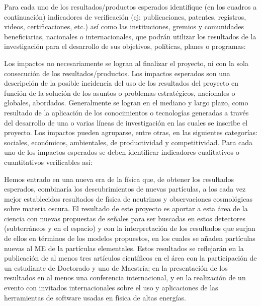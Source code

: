 \begin{instrucciones}
  Para cada uno de los resultados/productos esperados identifique (en
  los cuadros a continuación) indicadores de verificación (ej:
  publicaciones, patentes, registros, videos, certificaciones, etc.)
  así como las instituciones, gremios y comunidades beneficiarias,
  nacionales o internacionales, que podrán utilizar los resultados de
  la investigación para el desarrollo de sus objetivos, políticas,
  planes o programas:

\end{instrucciones}

\begin{instrucciones}
  Los impactos no necesariamente se logran al finalizar el proyecto, ni
con la sola consecución de los resultados/productos. Los impactos
esperados son una descripción de la posible incidencia del uso de los
resultados del proyecto en función de la solución de los asuntos o
problemas estratégicos, nacionales o globales, abordados. Generalmente
se logran en el mediano y largo plazo, como resultado de la aplicación
de los conocimientos o tecnologías generadas a través del desarrollo
de una o varias líneas de investigación en las cuales se inscribe el
proyecto. Los impactos pueden agruparse, entre otras, en las
siguientes categorías: sociales, económicos, ambientales, de
productividad y competitividad. Para cada uno de los impactos
esperados se deben identificar indicadores cualitativos o
cuantitativos verificables así:
\end{instrucciones}


Hemos entrado en una nueva era de la física que, de obtener los
resultados esperados, combinaría los descubrimientos de nuevas
partículas, a los cada vez mejor establecidos resultados de física de
neutrinos y observaciones cosmológicas sobre materia oscura. El
resultado de este proyecto es aportar a esta área de la ciencia con
nuevas propuestas de señales para ser buscadas en estos detectores
(subterráneos y en el espacio) y con la interpretación de los
resultados que surjan de ellos en términos de los modelos propuestos,
en los cuales se añaden partículas nuevas al ME de la partículas
elementales. Estos resultados se reflejarán en la publicación de al
menos tres artículos científicos en el área con la participación de un
estudiante de Doctorado y uno de Maestría; en la presentación de los
resultados en al menos una conferencia internacional, y en la
realización de un evento con invitados internacionales sobre el uso y
aplicaciones de las herramientas de software usadas en física de altas
energías.

